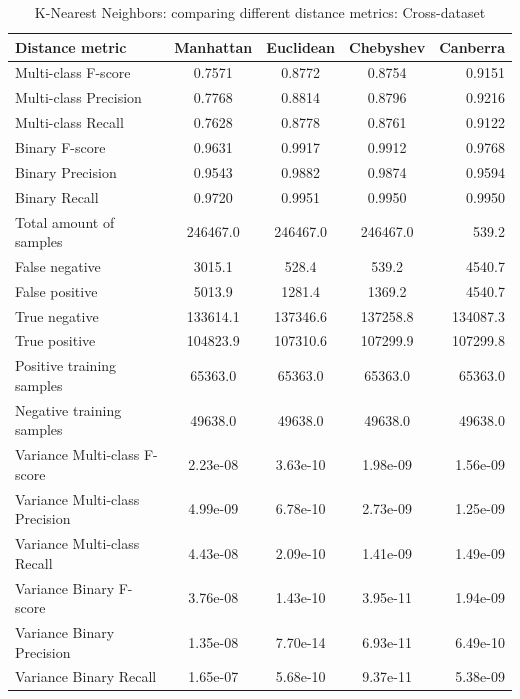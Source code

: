 \begin{table}[H]
\caption{K-Nearest Neighbors: comparing different distance metrics: Cross-dataset}
\label{tab:knn:dis}
\centering
\begin{tabular}{l c c c r}
\toprule
Distance metric & Manhattan & Euclidean & Chebyshev & Canberra \\
\midrule
Multi-class F-score & 0.7571 & 0.8772 & 0.8754 & 0.9151\\
Multi-class Precision & 0.7768 & 0.8814 & 0.8796 & 0.9216\\
Multi-class Recall & 0.7628 & 0.8778 & 0.8761 & 0.9122\\
\midrule
Binary F-score & 0.9631 & 0.9917 & 0.9912 & 0.9768\\
Binary Precision & 0.9543 & 0.9882 & 0.9874 & 0.9594 \\
Binary Recall & 0.9720 & 0.9951 & 0.9950 & 0.9950 \\
\midrule
Total amount of samples & 246467.0 & 246467.0 & 246467.0 & 539.2\\
False negative & 3015.1 & 528.4 & 539.2 & 4540.7 \\
False positive & 5013.9 & 1281.4 & 1369.2 & 4540.7 \\
True negative & 133614.1 & 137346.6 & 137258.8 & 134087.3 \\
True positive & 104823.9 & 107310.6 & 107299.9 & 107299.8\\
\midrule
Positive training samples & 65363.0 & 65363.0 & 65363.0 & 65363.0 \\
Negative training samples & 49638.0 & 49638.0 & 49638.0 & 49638.0\\
\midrule
Variance Multi-class F-score & 2.23e-08 & 3.63e-10 & 1.98e-09 & 1.56e-09\\
Variance Multi-class Precision & 4.99e-09 & 6.78e-10 & 2.73e-09 & 1.25e-09\\
Variance Multi-class Recall & 4.43e-08 & 2.09e-10 & 1.41e-09 &  1.49e-09\\
\midrule
Variance Binary F-score & 3.76e-08 & 1.43e-10 & 3.95e-11 & 1.94e-09\\
Variance Binary Precision & 1.35e-08 & 7.70e-14 & 6.93e-11 & 6.49e-10\\
Variance Binary Recall & 1.65e-07 & 5.68e-10 & 9.37e-11 & 5.38e-09\\
\bottomrule
\end{tabular}
\end{table}

